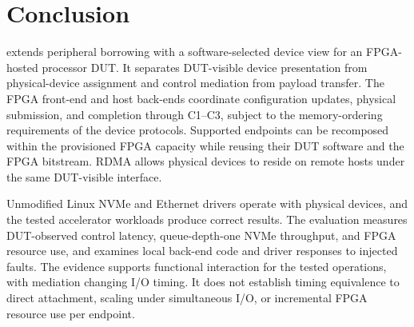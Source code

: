 \section{Conclusion}
\label{sec:conclusion}

\sys extends peripheral borrowing with a software-selected device view
for an FPGA-hosted processor DUT. It separates DUT-visible device presentation
from physical-device assignment and control mediation from payload transfer.
The FPGA front-end and host back-ends coordinate configuration updates,
physical submission, and completion through C1--C3, subject to the
memory-ordering requirements of the device protocols. Supported endpoints
can be recomposed within the provisioned FPGA capacity while reusing their
DUT software and the FPGA bitstream. RDMA allows physical devices to reside
on remote hosts under the same DUT-visible interface.

Unmodified Linux NVMe and Ethernet drivers operate with physical devices,
and the tested accelerator workloads produce correct results. The evaluation
measures DUT-observed control latency, queue-depth-one NVMe throughput,
and FPGA resource use, and examines local back-end code and driver responses
to injected faults. The evidence supports functional interaction for the
tested operations, with mediation
changing I/O timing. It does not establish timing equivalence to direct
attachment, scaling under simultaneous I/O, or incremental FPGA resource
use per endpoint.
